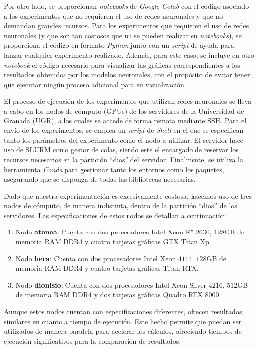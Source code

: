 Por otro lado, se proporcionan \textit{notebooks} de \textit{Google Colab} con el código asociado a los experimentos que no requieren el uso de redes neuronales y que no demandan grandes recursos. Para los experimentos que requieren el uso de redes neuronales (y que son tan costosos que no se pueden realizar en \textit{notebooks}), se proporciona el código en formato \textit{Python} junto con un \textit{script} de ayuda para lanzar cualquier experimento realizado. Además, para este caso, se incluye en otro \textit{notebook} el código necesario para visualizar las gráficas correspondientes a los resultados obtenidos por los modelos neuronales, con el propósito de evitar tener que ejecutar ningún proceso adicional para su visualización.

El proceso de ejecución de los experimentos que utilizan redes neuronales se lleva a cabo en los nodos de cómputo (GPUs) de los servidores de la Universidad de Granada (UGR), a los cuales se accede de forma remota mediante SSH. Para el envío de los experimentos, se emplea un \textit{script} de \textit{Shell} en el que se especifican tanto los parámetros del experimento como el nodo a utilizar. El servidor hace uso de SLURM como gestor de colas, siendo este el encargado de reservar los recursos necesarios en la partición ``dios'' del servidor. Finalmente, se utiliza la herramienta \textit{Conda} para gestionar tanto los entornos como los paquetes, asegurando que se disponga de todas las bibliotecas necesarias.

Dado que nuestra experimentación es excesivamente costosa, hacemos uso de tres nodos de cómputo, de manera indistinta, dentro de la partición ``dios'' de los servidores. Las especificaciones de estos nodos se detallan a continuación:

\begin{enumerate}
    \item Nodo \textbf{atenea}: Cuenta con dos procesadores Intel Xeon E5-$2630$, $128$GB de memoria RAM DDR$4$ y cuatro tarjetas gráficas GTX Titan Xp.
    \item Nodo \textbf{hera}: Cuenta con dos procesadores Intel Xeon $4114$, $128$GB de memoria RAM DDR$4$ y cuatro tarjetas gráficas Titan RTX.
    \item Nodo \textbf{dionisio}: Cuenta con dos procesadores Intel Xeon Silver $4216$, $512$GB de memoria RAM DDR$4$ y dos tarjetas gráficas Quadro RTX $8000$.
\end{enumerate}

Aunque estos nodos cuentan con especificaciones diferentes, ofrecen resultados similares en cuanto a tiempo de ejecución. Este hecho permite que puedan ser utilizados de manera paralela para acelerar los cálculos, ofreciendo tiempos de ejecución significativos para la comparación de resultados.

